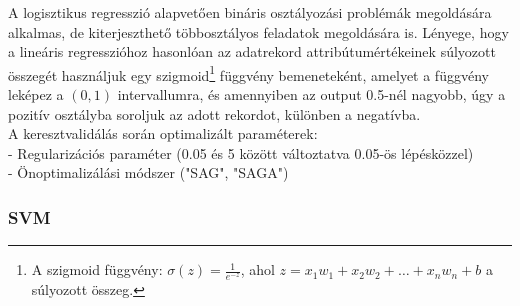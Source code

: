 \documentclass[12pt]{article}
\begin{document}
A logisztikus regresszió alapvetően bináris osztályozási problémák megoldására alkalmas, de kiterjeszthető többosztályos feladatok megoldására is. Lényege, hogy a lineáris regresszióhoz hasonlóan az adatrekord attribútumértékeinek súlyozott összegét használjuk egy szigmoid\footnote{A szigmoid függvény: $\sigma(z)=\frac{1}{e^{-z}}$, ahol $z=x_1w_1+x_2w_2+ \dots +x_nw_n+b$ a súlyozott összeg.} függvény bemeneteként, amelyet a függvény leképez a $\left(0,1\right)$ intervallumra, és amennyiben az output 0.5-nél nagyobb, úgy a pozitív osztályba soroljuk az adott rekordot, különben a negatívba. \\

\noindent A keresztvalidálás során optimalizált paraméterek: \\
- Regularizációs paraméter (0.05 és 5 között változtatva 0.05-ös lépésközzel) \\
- Önoptimalizálási módszer ("SAG", "SAGA") 

\subsubsection{SVM}

%
\end{document}

